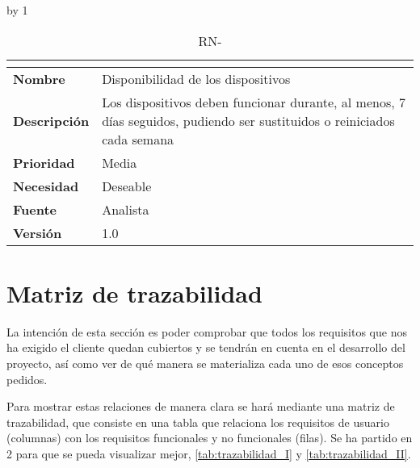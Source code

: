 \advance\rn by 1
\vspace{-.3cm}
\begin{table}[H]
	\caption{RN-\number\rn}
	\begin{tabular}{|l|p{}|}
		\hline
		\multicolumn{2}{|c|}{\cellcolor[HTML]{BFBFBF}{\color[HTML]{000000} \textbf{RN-\number\rn}}} \\ \hline
		\textbf{Nombre}      & Disponibilidad de los dispositivos                                                                                     \\ \hline
		\textbf{Descripción} & Los dispositivos deben funcionar durante, al menos, 7 días seguidos, pudiendo ser sustituidos o reiniciados cada semana \\ \hline
		\textbf{Prioridad}   & Media                                                                                                                  \\ \hline
		\textbf{Necesidad}   & Deseable                                                                                                               \\ \hline
		\textbf{Fuente}      & Analista                                                                                                               \\ \hline
		\textbf{Versión}     & 1.0                                                                                                                    \\ \hline
	\end{tabular}
\end{table}
\pagebreak

\section{Matriz de trazabilidad}\label{sec:matrizAnalisis}
La intención de esta sección es poder comprobar que todos los requisitos que nos ha exigido el cliente quedan cubiertos y se tendrán en cuenta en el desarrollo del proyecto, así como ver de qué manera se materializa cada uno de esos conceptos pedidos. 

Para mostrar estas relaciones de manera clara se hará mediante una matriz de trazabilidad, que consiste en una tabla que relaciona los requisitos de usuario (columnas) con los requisitos funcionales y no funcionales (filas). Se ha partido en 2 para que se pueda visualizar mejor, \autoref{tab:trazabilidad_I} y \autoref{tab:trazabilidad_II}.

